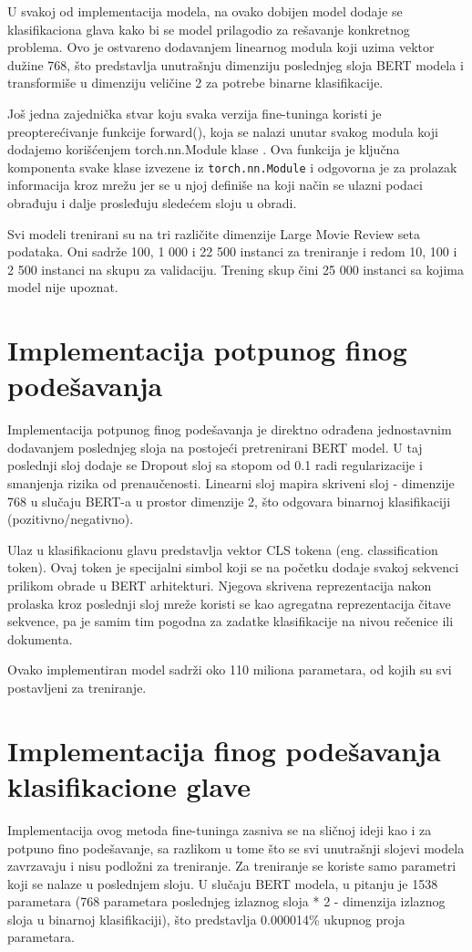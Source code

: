 \documentclass[12pt,oneside]{memoir}
\begin{document}
U svakoj od implementacija modela, na ovako dobijen model dodaje se klasifikaciona glava kako bi se model prilagodio za rešavanje konkretnog problema. Ovo je ostvareno dodavanjem linearnog modula koji uzima vektor dužine 768, što predstavlja unutrašnju dimenziju poslednjeg sloja BERT modela i transformiše u dimenziju veličine 2 za potrebe binarne klasifikacije. 

Još jedna zajednička stvar koju svaka verzija fine-tuninga koristi je preopterećivanje funkcije forward(), koja se nalazi unutar svakog modula koji dodajemo korišćenjem torch.nn.Module klase \cite{pytorch_nn_module}. Ova funkcija je ključna komponenta svake klase izvezene iz \texttt{torch.nn.Module} i odgovorna je za prolazak informacija kroz mrežu jer se u njoj definiše na koji način se ulazni podaci obrađuju i dalje prosleđuju sledećem sloju u obradi.  

Svi modeli trenirani su na tri različite dimenzije Large Movie Review seta podataka. Oni sadrže 100, 1 000 i 22 500 instanci za treniranje i redom 10, 100 i 2 500 instanci na skupu za validaciju. Trening skup čini 25 000 instanci sa kojima model nije upoznat.

\section{Implementacija potpunog finog podešavanja}
Implementacija potpunog finog podešavanja je direktno odrađena jednostavnim dodavanjem poslednjeg sloja na postojeći pretrenirani BERT model. U taj poslednji sloj dodaje se Dropout sloj sa stopom od 0.1 radi regularizacije i smanjenja rizika od prenaučenosti. Linearni sloj mapira skriveni sloj - dimenzije 768 u slučaju BERT-a u prostor dimenzije 2, što odgovara binarnoj klasifikaciji (pozitivno/negativno). 

Ulaz u klasifikacionu glavu predstavlja vektor CLS tokena (eng. classification token). Ovaj token je specijalni simbol koji se na početku dodaje svakoj sekvenci prilikom obrade u BERT arhitekturi. Njegova skrivena reprezentacija nakon prolaska kroz poslednji sloj mreže koristi se kao agregatna reprezentacija čitave sekvence, pa je samim tim pogodna za zadatke klasifikacije na nivou rečenice ili dokumenta. 

Ovako implementiran model sadrži oko 110 miliona parametara, od kojih su svi postavljeni za treniranje. 

\section{Implementacija finog podešavanja klasifikacione glave}
Implementacija ovog metoda fine-tuninga zasniva se na sličnoj ideji kao i za potpuno fino podešavanje, sa razlikom u tome što se svi unutrašnji slojevi modela zavrzavaju i nisu podložni za treniranje. Za treniranje se koriste samo parametri koji se nalaze u poslednjem sloju. U slučaju BERT modela, u pitanju je 1538 parametara (768 parametara poslednjeg izlaznog sloja * 2 - dimenzija izlaznog sloja u binarnoj klasifikaciji), što predstavlja 0.000014\% ukupnog proja parametara. 
\end{document}
